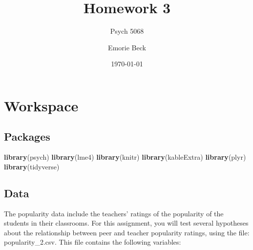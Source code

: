 \documentclass[]{article}
\title{Homework 3}
\subtitle{Psych 5068}
\author{Emorie Beck}
\date{\today}
\newenvironment{Shaded}{\begin{snugshade}}{\end{snugshade}}
\newcommand{\KeywordTok}[1]{\textcolor[rgb]{0.13,0.29,0.53}{\textbf{#1}}}
\newcommand{\DataTypeTok}[1]{\textcolor[rgb]{0.13,0.29,0.53}{#1}}
\newcommand{\DecValTok}[1]{\textcolor[rgb]{0.00,0.00,0.81}{#1}}
\newcommand{\StringTok}[1]{\textcolor[rgb]{0.31,0.60,0.02}{#1}}
\newcommand{\OperatorTok}[1]{\textcolor[rgb]{0.81,0.36,0.00}{\textbf{#1}}}
\newcommand{\NormalTok}[1]{#1}
\begin{document}
\maketitle

{
\setcounter{tocdepth}{2}
\tableofcontents
}
\section{Workspace}\label{workspace}

\subsection{Packages}\label{packages}

\begin{Shaded}
\begin{Highlighting}[]
\KeywordTok{library}\NormalTok{(psych)}
\KeywordTok{library}\NormalTok{(lme4)}
\KeywordTok{library}\NormalTok{(knitr)}
\KeywordTok{library}\NormalTok{(kableExtra)}
\KeywordTok{library}\NormalTok{(plyr)}
\KeywordTok{library}\NormalTok{(tidyverse)}
\end{Highlighting}
\end{Shaded}

\subsection{Data}\label{data}

\begin{Shaded}
\end{Shaded}

The popularity data include the teachers' ratings of the popularity of
the students in their classrooms. For this assignment, you will test
several hypotheses about the relationship between peer and teacher
popularity ratings, using the file: popularity\_2.csv. This file
contains the following variables:
\end{document}
